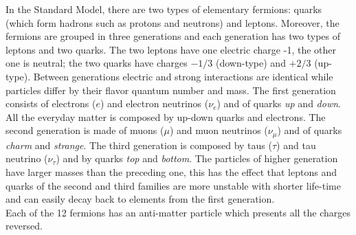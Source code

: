 In the Standard Model, there are two types of elementary fermions: quarks (which form hadrons such as protons and neutrons) and leptons. 
Moreover, the fermions are grouped in three generations and each generation has two types of leptons and two quarks. The two leptons have one electric charge -1, the other one is neutral; the two quarks have charges $-1/3$ (down-type) and $+2/3$ (up-type). Between generations electric and strong interactions are identical while particles differ by their flavor quantum number and mass.  The first generation consists of electrons ($e$) and electron neutrinos ($\nu_e$) and of quarks \emph{up} and \emph{down}. All the everyday matter is composed by up-down quarks and electrons. The second generation is made of muons ($\mu$) and muon neutrinos ($\nu_\mu$) and of quarks \emph{charm} and \emph{strange}. The third generation is composed by taus ($\tau$) and tau neutrino ($\nu_\tau$) and by quarks \emph{top} and \emph{bottom}. The particles of higher generation have larger masses than the preceding one, this has the effect that leptons and quarks of the second and third families are more unstable with shorter life-time and can easily decay back to elements from the first generation.\\
Each of the 12 fermions has an anti-matter particle which presents all the charges reversed.

